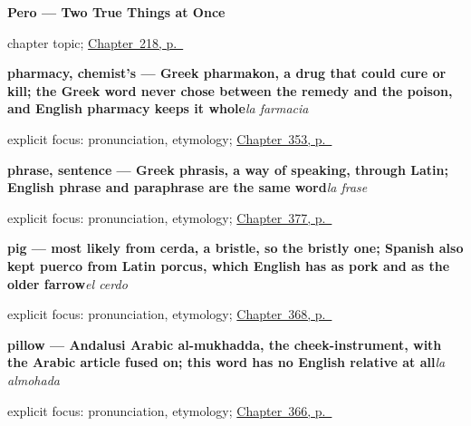 \noindent\begin{minipage}[t]{\linewidth}
\raggedright
\textbf{Pero --- Two True Things at Once}\par
\footnotesize chapter topic; \hyperref[ch:pero]{Chapter~218, p.~\pageref*{ch:pero}}
\end{minipage}\par\smallskip

\noindent\begin{minipage}[t]{\linewidth}
\raggedright
\textbf{pharmacy, chemist's — Greek pharmakon, a drug that could cure or kill; the Greek word never chose between the remedy and the poison, and English pharmacy keeps it whole}\enspace\emph{la farmacia}\par
\footnotesize explicit focus: pronunciation, etymology; \hyperref[ch:el-hospital-y-el-banco]{Chapter~353, p.~\pageref*{ch:el-hospital-y-el-banco}}
\end{minipage}\par\smallskip

\noindent\begin{minipage}[t]{\linewidth}
\raggedright
\textbf{phrase, sentence — Greek phrasis, a way of speaking, through Latin; English phrase and paraphrase are the same word}\enspace\emph{la frase}\par
\footnotesize explicit focus: pronunciation, etymology; \hyperref[ch:la-letra-y-la-frase]{Chapter~377, p.~\pageref*{ch:la-letra-y-la-frase}}
\end{minipage}\par\smallskip

\noindent\begin{minipage}[t]{\linewidth}
\raggedright
\textbf{pig — most likely from cerda, a bristle, so the bristly one; Spanish also kept puerco from Latin porcus, which English has as pork and as the older farrow}\enspace\emph{el cerdo}\par
\footnotesize explicit focus: pronunciation, etymology; \hyperref[ch:la-abeja-y-la-mosca]{Chapter~368, p.~\pageref*{ch:la-abeja-y-la-mosca}}
\end{minipage}\par\smallskip

\noindent\begin{minipage}[t]{\linewidth}
\raggedright
\textbf{pillow — Andalusi Arabic al-mukhadda, the cheek-instrument, with the Arabic article fused on; this word has no English relative at all}\enspace\emph{la almohada}\par
\footnotesize explicit focus: pronunciation, etymology; \hyperref[ch:la-caja-y-la-lampara]{Chapter~366, p.~\pageref*{ch:la-caja-y-la-lampara}}
\end{minipage}\par\smallskip

